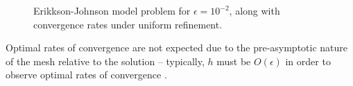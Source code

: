 \documentclass[final,leqno]{siamltex}
\begin{document}
\begin{figure}[!h]
\centering
{}
\caption{Erikkson-Johnson model problem for $\epsilon = 10^{-2}$, along with convergence rates under uniform refinement.}
\label{fig:erikkson}
\end{figure}
Optimal rates of convergence are not expected due to the pre-asymptotic nature of the mesh relative to the solution -- typically, $h$ must be $O(\epsilon)$ in order to observe optimal rates of convergence \cite{SchwabBoundaryLayers}.  
\end{document}
